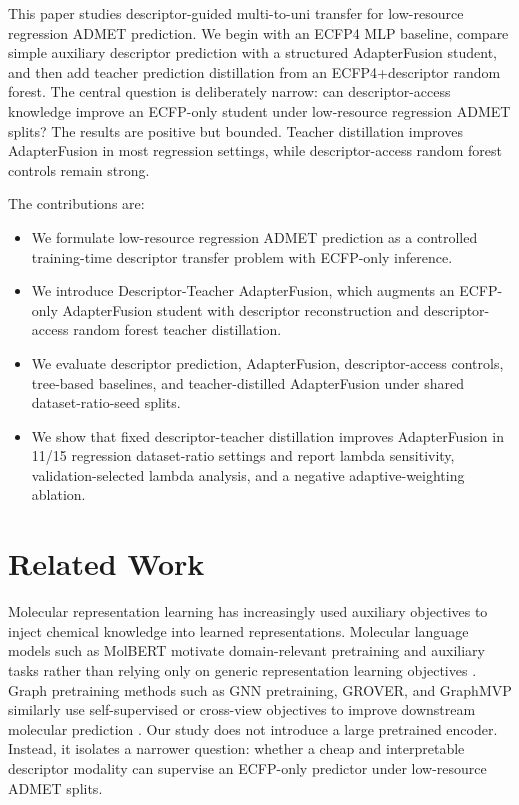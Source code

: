 \documentclass[11pt]{article}
\begin{document}
This paper studies descriptor-guided multi-to-uni transfer for low-resource
regression ADMET prediction. We begin with an ECFP4 MLP baseline, compare
simple auxiliary descriptor prediction with a structured AdapterFusion student,
and then add teacher prediction distillation from an ECFP4+descriptor random
forest. The central question is deliberately narrow: can descriptor-access
knowledge improve an ECFP-only student under low-resource regression ADMET
splits? The results are positive but bounded. Teacher distillation improves
AdapterFusion in most regression settings, while descriptor-access random
forest controls remain strong.

The contributions are:
\begin{itemize}
  \item We formulate low-resource regression ADMET prediction as a controlled
  training-time descriptor transfer problem with ECFP-only inference.
  \item We introduce Descriptor-Teacher AdapterFusion, which augments an
  ECFP-only AdapterFusion student with descriptor reconstruction and
  descriptor-access random forest teacher distillation.
  \item We evaluate descriptor prediction, AdapterFusion, descriptor-access
  controls, tree-based baselines, and teacher-distilled AdapterFusion under
  shared dataset-ratio-seed splits.
  \item We show that fixed descriptor-teacher distillation improves
  AdapterFusion in 11/15 regression dataset-ratio settings and report lambda
  sensitivity, validation-selected lambda analysis, and a negative
  adaptive-weighting ablation.
\end{itemize}

\section{Related Work}

Molecular representation learning has increasingly used auxiliary objectives
to inject chemical knowledge into learned representations. Molecular language
models such as MolBERT motivate domain-relevant pretraining and auxiliary
tasks rather than relying only on generic representation learning objectives
\citep{Fabian2020MolBERT}. Graph pretraining methods such as GNN pretraining,
GROVER, and GraphMVP similarly use self-supervised or cross-view objectives to
improve downstream molecular prediction
\citep{Hu2020PretrainGNN,Rong2020GROVER,Liu2022GraphMVP}. Our study does not
introduce a large pretrained encoder. Instead, it isolates a narrower question:
whether a cheap and interpretable descriptor modality can supervise an
ECFP-only predictor under low-resource ADMET splits.
\end{document}
